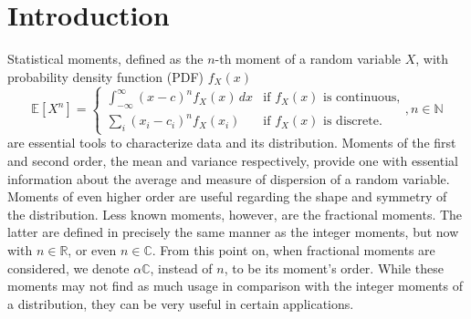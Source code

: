 \section{Introduction}\label{s:intro}
Statistical moments, defined as the \(n\)-th moment of a random variable \(X\), with probability density function (PDF) \(f_X(x)\) 
\[
\mathbb{E}[X^n] = 
\begin{cases} 
\int_{-\infty}^{\infty} (x - c)^n f_X(x) \, dx & \text{if } f_X(x) \text{ is continuous,} \\ 
\sum_{i} (x_i - c_ i)^n f_X(x_i) & \text{if } f_X(x) \text{ is discrete.} 
\end{cases}, n \in \mathbb{N}
\] are essential tools to characterize data and its distribution. Moments of the first and second order, the mean and variance respectively, provide one with essential information about the average and measure of dispersion of a random variable. Moments of even higher order are useful regarding the shape and symmetry of the distribution. Less known moments, however, are the fractional moments. The latter are defined in precisely the same manner as the integer moments, but now with \(n \in \mathbb{R}\), or even \(n \in \mathbb{C}\). From this point on, when fractional moments are considered, we denote \(\alpha \mathbb{C}\), instead of \(n\), to be its moment's order. While these moments may not find as much usage in comparison with the integer moments of a distribution, they can be very useful in certain applications.
\newline
